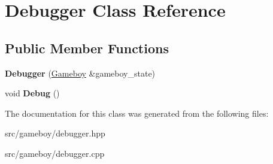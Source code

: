 \hypertarget{classDebugger}{}\section{Debugger Class Reference}
\label{classDebugger}
\subsection*{Public Member Functions}
\begin{DoxyCompactItemize}
\item 
\mbox{\label{classDebugger_a75b2a03d64e618c422e5082b39c5dc73}} 
{\bfseries Debugger} (\mbox{\hyperlink{classGameboy}{Gameboy}} \&gameboy\+\_\+state)
\item 
\mbox{\label{classDebugger_a1c735f679f4e5195a976432156a9d9b1}} 
void {\bfseries Debug} ()
\end{DoxyCompactItemize}


The documentation for this class was generated from the following files\+:\begin{DoxyCompactItemize}
\item 
src/gameboy/debugger.\+hpp\item 
src/gameboy/debugger.\+cpp\end{DoxyCompactItemize}
